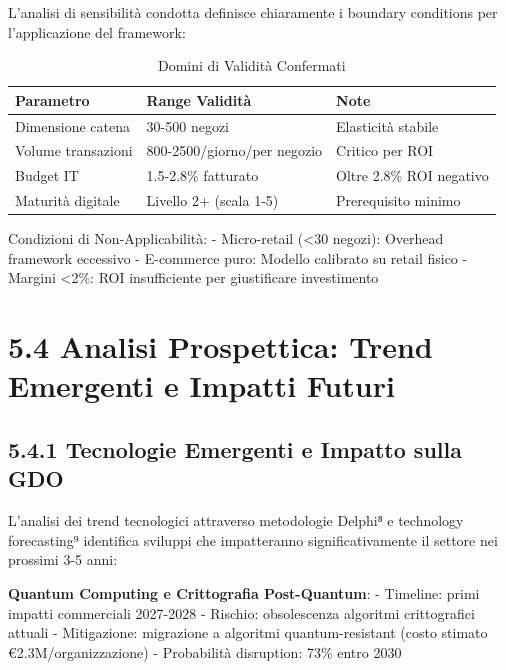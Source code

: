 \documentclass[12pt,a4paper,oneside]{book}
\numberwithin{figure}{chapter} %
\numberwithin{table}{chapter}  %
\begin{document}
L'analisi di sensibilità condotta definisce chiaramente i boundary 
conditions per l'applicazione del framework:
\begin{table}[h]
    \centering
    \begin{tabular}{|l|l|l|}
    \hline
    \textbf{Parametro}         & \textbf{Range Validità}        & \textbf{Note}           \\ \hline
    Dimensione catena    & 30-500 negozi           & Elasticità stabile        \\ \hline
    Volume transazioni   & 800-2500/giorno/per negozio & Critico per ROI          \\ \hline
    Budget IT            & 1.5-2.8\% fatturato    & Oltre 2.8\% ROI negativo \\ \hline
    Maturità digitale    & Livello 2+ (scala 1-5) & Prerequisito minimo       \\ \hline
    \end{tabular}
    \caption{Domini di Validità Confermati}
    \label{tab:domini_validita}
\end{table}

Condizioni di Non-Applicabilità:
- Micro-retail (<30 negozi): Overhead framework eccessivo
- E-commerce puro: Modello calibrato su retail fisico
- Margini <2\%: ROI insufficiente per giustificare investimento


\section{5.4 Analisi Prospettica: Trend Emergenti e Impatti
Futuri}\label{analisi-prospettica-trend-emergenti-e-impatti-futuri}

\subsection{5.4.1 Tecnologie Emergenti e Impatto sulla
GDO}\label{tecnologie-emergenti-e-impatto-sulla-gdo}

L'analisi dei trend tecnologici attraverso metodologie Delphi⁸ e
technology forecasting⁹ identifica sviluppi che impatteranno
significativamente il settore nei prossimi 3-5 anni:

\textbf{Quantum Computing e Crittografia Post-Quantum}: - Timeline:
primi impatti commerciali 2027-2028 - Rischio: obsolescenza algoritmi
crittografici attuali - Mitigazione: migrazione a algoritmi
quantum-resistant (costo stimato €2.3M/organizzazione) - Probabilità
disruption: 73\% entro 2030
\end{document}
